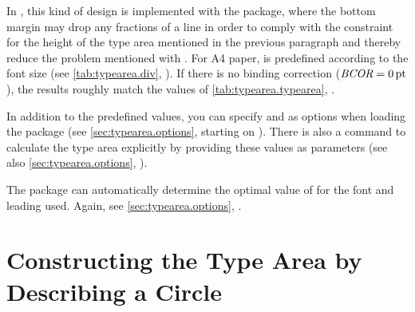 \begin{Explain}
  In {\KOMAScript}, this kind of design is implemented with the
   package, where the bottom margin may drop any fractions
  of a line in order to comply with the constraint for the height of the type
  area mentioned in the previous paragraph and thereby reduce the problem
  mentioned with . For A4 paper,  is predefined
  according to the font size (see \autoref{tab:typearea.div},
  ). If there is no binding correction
  (\(\Var{BCOR} = 0\Unit{pt}\)), the results roughly match the values of
  \autoref{tab:typearea.typearea}, .

  In addition to the predefined values, you can specify  and
   as options when loading the package (see
  \autoref{sec:typearea.options}, starting on
  ). There is also a command to calculate
  the type area explicitly by providing these values as parameters (see also
  \autoref{sec:typearea.options}, ).

  The  package can automatically determine the optimal value
  of  for the font and leading used. Again, see
  \autoref{sec:typearea.options}, .
\end{Explain}


\section{Constructing the Type Area by Describing a Circle}

